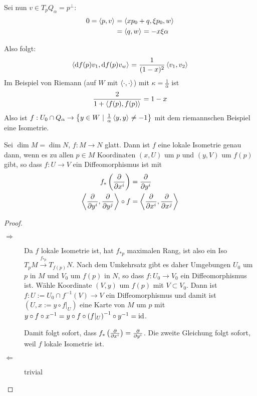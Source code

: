 \documentclass{skript}
\begin{document}
\begin{dfn}
\begin{bsps}
\begin{enumerate}
        Sei nun $v\in T_pQ_\alpha = p^\perp$:
        \begin{align*}
          0 = \sprod{p,v} &= \sprod{xp_0 + q, \xi p_0, w} \\
          &= \sprod{q,w} = -x \xi \alpha
        \end{align*}

        Also folgt:
        \begin{align*}
          \sprod{\d f(p)v_1, \d f(p)v_w} = \frac{1}{(1-x)^2}\sprod{v_1, v_2}
        \end{align*}
        Im Beispiel von Riemann (auf $W$ mit $\sprod{\cdot,\cdot}$) mit $\kappa
        = \frac1\alpha$ ist
        \begin{align*}
          \frac{2}{1+ \sprod{f(p), f(p)}} = 1- x
        \end{align*}
        Also ist $f: U_0\cap Q_\alpha\to\mdef[y\in
        W]{\frac{1}{\alpha}\sprod{y,y} \ne -1}$ mit dem riemannschen Beispiel
        eine Isometrie.
    \end{enumerate}
  \end{bsps}
\end{dfn}

\begin{stz}
  Sei $\dim M = \dim N$, $f: M\to N$ glatt. Dann ist $f$ eine lokale Isometrie
  genau dann, wenn es zu allen $p\in M$ Koordinaten $(x, U)$ um $p$ und $(y, V)$
  um $f(p)$ gibt, so dass $f:U\to V$ ein Diffeomorphismus ist mit
  \begin{align*}
    f_*\left(\del{i}\right) &= \dd{y^i}{} \\
    \sprod{\dd{y^i}{},\dd{y^j}{}}\circ f &= \sprod{\del{i}, \del{j}}
  \end{align*}

  \begin{proof}
    \begin{description}
      \item[$\Rightarrow$]Da $f$ lokale Isometrie ist, hat $f_{*p}$ maximalen
        Rang, ist also ein Iso $T_pM\overset{f_{*p}}{\to}T_{f(p)}N$. Nach dem Umkehrsatz
        gibt es daher Umgebungen $U_0$ um $p$ in $M$ und $V_{0}$ um $f(p)$ in
        $N$, so dass $f:U_0\to V_0$ ein Diffeomorphismus ist. Wähle Koordinate
        $(V,y)$ um $f(p)$ mit $V\subset V_0$. Dann ist $f:U:=U_0\cap
        f^{-1}(V)\to V$ ein Diffeomorphismus und damit ist $(U,x := y\circ
        f\vert_U)$ eine Karte von $M$ um $p$ mit $y\circ f\circ x^{-1} = y\circ
        f\circ \left( f\vert_U \right)^{-1}\circ y^{-1} = \operatorname{id}$.

        Damit folgt sofort, dass $f_*\left( \del{i} \right) = \dd{y^i}{}$. Die
        zweite Gleichung folgt sofort, weil $f$ lokale Isometrie ist.
      \item[$\Leftarrow$]trivial
    \end{description}
  \end{proof}
\end{stz}
\end{document}
